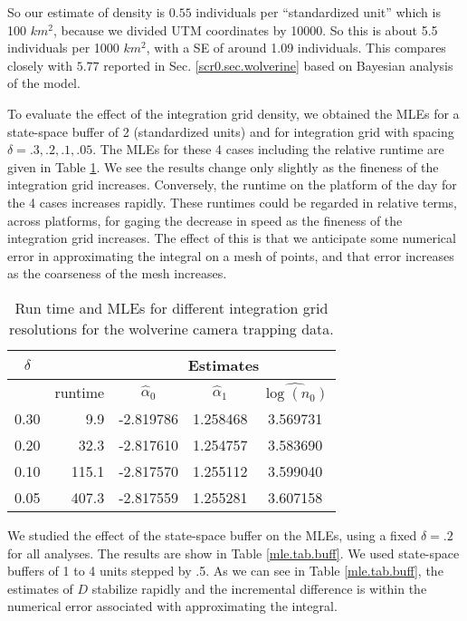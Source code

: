 So our estimate of density is $0.55$ individuals per ``standardized
unit'' which is 100 $km^2$, because we divided UTM coordinates by
10000.  So this is about 5.5 individuals per 1000 $km^2$,
with a SE of around 1.09
individuals.  This compares closely with $5.77$
reported in
Sec. \ref{scr0.sec.wolverine} based on Bayesian
analysis of the model.


To evaluate the effect of the integration grid density, 
we obtained the MLEs for a state-space buffer of 2 (standardized
units) and for integration grid with spacing $\delta = .3, .2, .1,
.05$. The MLEs for these 4 cases including the relative runtime are
given in Table \ref{mle.tab.integration}.
We see the results change only slightly as the fineness of the
integration grid increases. Conversely, the runtime on the platform of
the day for the 4 cases increases rapidly. 
These runtimes could be regarded in
relative terms,  across platforms, for gaging the decrease in
speed as the fineness of the integration grid increases. The effect of
this is that we anticipate some numerical error in approximating the
integral on a mesh of points, and that error increases as the
coarseness of the mesh increases. 


\begin{table}[ht]
\centering
\caption{Run time and MLEs for different integration grid resolutions
  for the wolverine camera trapping data.}
\begin{tabular}{crccc}
\hline \hline
$\delta$ &   & \multicolumn{3}{c}{Estimates} \\ \hline
         &  runtime        & $\hat{\alpha}_0$ & $\hat{\alpha}_1$ &  $\widehat{\log(n_0)}$ \\ \hline
 0.30   &  9.9  &  -2.819786 & 1.258468 & 3.569731  \\
 0.20   & 32.3  &  -2.817610 & 1.254757 & 3.583690 \\
 0.10  & 115.1  &  -2.817570 & 1.255112 & 3.599040 \\
 0.05 &  407.3 &   -2.817559&  1.255281&  3.607158 \\ \hline
\end{tabular}
\label{mle.tab.integration}
\end{table}


We studied the effect of the state-space buffer on the MLEs,
using a fixed $\delta = .2$ for all analyses. The results are show in Table \ref{mle.tab.buff}. 
We used state-space buffers
of 1 to 4 units stepped by .5. As we can see in Table \ref{mle.tab.buff}, 
the estimates of $D$ stabilize rapidly and the incremental difference
is within the numerical error associated with approximating the
integral.  

